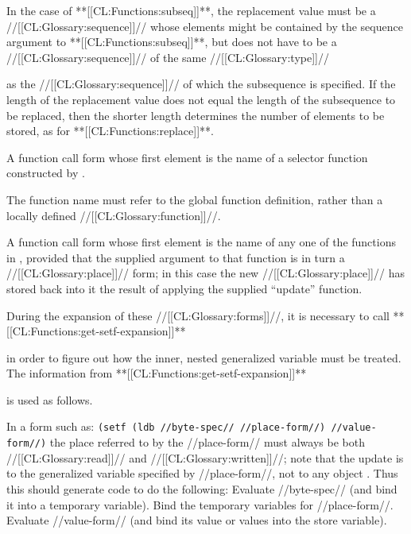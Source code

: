 In the case of **[[CL:Functions:subseq]]**, the replacement value must be a //[[CL:Glossary:sequence]]// whose elements might be contained by the sequence argument to **[[CL:Functions:subseq]]**, but does not have to be a //[[CL:Glossary:sequence]]// of the same //[[CL:Glossary:type]]// 

as the //[[CL:Glossary:sequence]]// of which the subsequence is specified. If the length of the replacement value does not equal the length of the subsequence to be replaced, then the shorter length determines the number of elements to be stored, as for **[[CL:Functions:replace]]**.

   \itemitem{\bull}

A function call form whose first element is the name of a selector function constructed by .

 The function name must refer to the global function definition, rather than a locally defined //[[CL:Glossary:function]]//.

\itemitem{\bull}

A function call form whose first element is the name of any one of the functions in \thenextfigure,  provided that the supplied argument to that function is in turn a //[[CL:Glossary:place]]// form; in this case the new //[[CL:Glossary:place]]// has stored back into it the result of applying the supplied ``update'' function.

                         

During the  expansion of these //[[CL:Glossary:forms]]//, it is necessary to call   **[[CL:Functions:get-setf-expansion]]** 

in order to figure out how the inner, nested generalized variable must be treated.  
  The information from  **[[CL:Functions:get-setf-expansion]]**

is used as follows. \beginlist {} 

  In a form such as:
        {\tt (setf (ldb //byte-spec// //place-form//) //value-form//)}
  the place referred to by the //place-form// must always be both //[[CL:Glossary:read]]//  and //[[CL:Glossary:written]]//;  note that the update is to the generalized variable  specified by //place-form//, not to any object .
        Thus this  should generate code to do the following:
  \beginlist {} Evaluate //byte-spec// (and bind it into a temporary variable).  Bind the temporary variables for //place-form//.  Evaluate //value-form//  (and bind   its value or values into the store variable).

